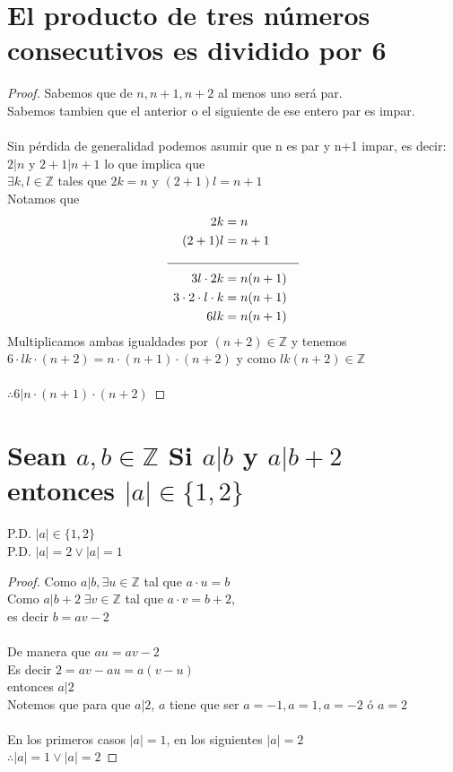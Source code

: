 \documentclass[12pt]{article}
\begin{document}
    \section{El producto de tres números consecutivos es dividido  por 6}
        \begin{proof}
            Sabemos que de $n,n+1,n+2$ al menos uno será par. \\
            Sabemos tambien que el anterior o el siguiente de ese entero par es impar. \\ \\
            Sin pérdida de generalidad podemos asumir que n es par y n+1 impar, es decir: \\
            $2|n$ y $2+1|n+1$ lo que implica que \\
            $\exists k,l \in \mathbb{Z}$ tales que $2k=n$ y $(2+1)l = n+1$ \\
            Notamos que
            \begin{align}
                \notag 2k &= n \\
                \notag (2+1)l &= n+1 \\
                \notag \line(1,0){45}&\line(1,0){60} \\
                \notag 3l \cdot 2k &= n(n+1) \\
                \notag 3 \cdot 2 \cdot l \cdot k &= n(n+1)  \\
                \notag 6lk &= n(n+1)
            \end{align}
            Multiplicamos ambas igualdades por $(n+2) \in \mathbb{Z}$ y tenemos $6 \cdot lk \cdot (n+2) = n \cdot (n+1) \cdot (n+2)$ y como $lk(n+2) \in \mathbb{Z}$ \\ \\
            $\therefore 6|n\cdot (n+1) \cdot (n+2)$ \quad \blacksquare
        \end{proof}
    \section{Sean $a,b \in \mathbb{Z}$ Si $a|b$ y $a|b+2$ entonces $|a| \in \{1,2\}$}
    P.D. $|a| \in \{1,2\}$ \\
    P.D. $|a| = 2 \vee |a| = 1$ \\
        \begin{proof}
            Como $a|b, \exists u \in \mathbb{Z} $ tal que $a \cdot u = b$ \\
            Como $a|b+2 \; \exists v \in \mathbb{Z} $ tal que $a \cdot v = b+2$, \\
            es decir $b=av-2$\\ \\
            De manera que $au = av-2$\\
            Es decir $2 = av-au = a(v-u)$ \\
            entonces $a|2$\\
            Notemos que para que $a|2$, $a$ tiene que ser $a=-1, a=1 ,a=-2$ ó $a=2$\\ \\
            En los primeros casos $|a| = 1$, en los siguientes $|a|=2$\\
            $\therefore |a|=1 \vee |a|=2$ \quad \blacksquare
        \end{proof}
\end{document}
